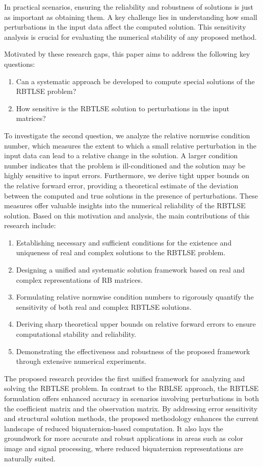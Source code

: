 \documentclass[preprint,11pt,3p]{elsarticle}
\begin{document}
In practical scenarios, ensuring the reliability and robustness of solutions is just as important as obtaining them. A key challenge lies in understanding how small perturbations in the input data affect the computed solution. This sensitivity analysis is crucial for evaluating the numerical stability of any proposed method.

Motivated by these research gaps, this paper aims to address the following key questions:
\begin{enumerate}
	\item Can a systematic approach be developed to compute special solutions of the RBTLSE problem?
	\item How sensitive is the RBTLSE solution to perturbations in the input matrices?
\end{enumerate}
To investigate the second question, we analyze the relative normwise condition number, which measures the extent to which a small relative perturbation in the input data can lead to a relative change in the solution. A larger condition number indicates that the problem is ill-conditioned and the solution may be highly sensitive to input errors. Furthermore, we derive tight upper bounds on the relative forward error, providing a theoretical estimate of the deviation between the computed and true solutions in the presence of perturbations. These measures offer valuable insights into the numerical reliability of the RBTLSE solution. Based on this motivation and analysis, the main contributions of this research include:
\begin{enumerate}
    \item Establishing necessary and sufficient conditions for the existence and uniqueness of real and complex solutions to the RBTLSE problem.
    \item Designing a unified and systematic solution framework based on real and complex representations of RB matrices.
    \item Formulating relative normwise condition numbers to rigorously quantify the sensitivity of both real and complex RBTLSE solutions.
    \item Deriving sharp theoretical upper bounds on relative forward errors to ensure computational stability and reliability.
    \item Demonstrating the effectiveness and robustness of the proposed framework through extensive numerical experiments.
\end{enumerate}
The proposed research provides the first unified framework for analyzing and solving the RBTLSE problem. In contrast to the RBLSE approach, the RBTLSE formulation offers enhanced accuracy in scenarios involving perturbations in both the coefficient matrix and the observation matrix. By addressing error sensitivity and structural solution methods, the proposed methodology enhances the current landscape of reduced biquaternion-based computation. It also lays the groundwork for more accurate and robust applications in areas such as color image and signal processing, where reduced biquaternion representations are naturally suited.
\end{document}
